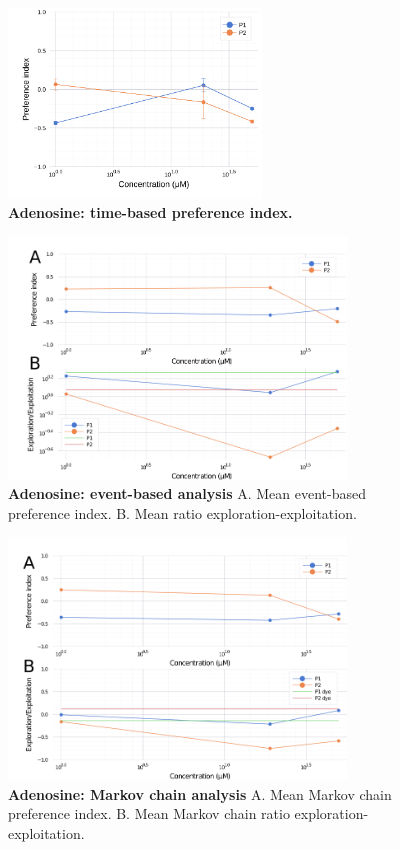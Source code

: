     \begin{figure}[h]
      \centering
      \includegraphics[width=0.6\textwidth]{part_2/assets/adenosine.png}
      \caption{\textbf{Adenosine: time-based preference index.} }
      \label{adenosine}
    \end{figure}

    \begin{figure}[h]
      \centering
      \includegraphics[width=0.8\textwidth]{part_2/assets/adenosine_event.png}
      \caption{\textbf{Adenosine: event-based analysis} A. Mean event-based preference index. B. Mean ratio exploration-exploitation.}
      \label{adenosine_event}
    \end{figure}

    \begin{figure}[h]
      \centering
      \includegraphics[width=0.8\textwidth]{part_2/assets/adenosine_markov.png}
      \caption{\textbf{Adenosine: Markov chain analysis} A. Mean Markov chain preference index. B. Mean Markov chain ratio exploration-exploitation.}
      \label{adenosine_markov}
    \end{figure}

